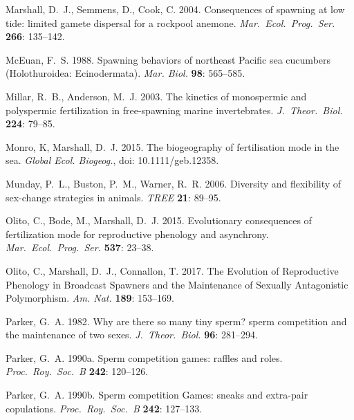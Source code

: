 \documentclass{article}
\begin{document}
\begin{thebibliography}{}
Marshall, D.~J., Semmens, D., Cook, C. 2004.
\newblock Consequences of spawning at low tide: limited gamete dispersal for a rockpool anemone.
\newblock \textit{Mar.~Ecol.~Prog.~Ser.} \textbf{266}: 135--142.

McEuan, F.~S. 1988.
\newblock Spawning behaviors of northeast Pacific sea cucumbers (Holothuroidea: Ecinodermata).
\newblock \textit{Mar. Biol.} \textbf{98}: 565--585.

Millar, R.~B., Anderson, M.~J. 2003.
\newblock The kinetics of monospermic and polyspermic fertilization in free-spawning marine invertebrates.
\newblock \textit{J.~Theor.~Biol.} \textbf{224}: 79--85.

Monro, K, Marshall, D.~J. 2015.
\newblock The biogeography of fertilisation mode in the sea.
\newblock \textit{Global Ecol. Biogeog.}, doi: 10.1111/geb.12358.

Munday, P.~L., Buston, P.~M., Warner, R.~R. 2006.
\newblock Diversity and flexibility of sex-change strategies in animals.
\newblock \textit{TREE} \textbf{21}: 89--95.

Olito, C., Bode, M., Marshall, D.~J. 2015.
\newblock Evolutionary consequences of fertilization mode for reproductive phenology and asynchrony.
\newblock \textit{Mar.~Ecol.~Prog.~Ser.} \textbf{537}: 23--38.

Olito, C., Marshall, D.~J., Connallon, T. 2017.
\newblock The Evolution of Reproductive Phenology in Broadcast Spawners and the Maintenance of Sexually Antagonistic Polymorphism.
\newblock \textit{Am. Nat.} \textbf{189}: 153--169.

Parker, G.~A. 1982.
\newblock Why are there so many tiny sperm? sperm competition and the maintenance of two sexes.
\newblock \textit{J.~Theor.~Biol.} \textbf{96}: 281--294.

Parker, G.~A. 1990a.
\newblock Sperm competition games: raffles and roles.
\newblock \textit{Proc.~Roy.~Soc.~B} \textbf{242}: 120--126.

Parker, G.~A. 1990b.
\newblock Sperm competition Games: sneaks and extra-pair copulations.
\newblock \textit{Proc.~Roy.~Soc.~B} \textbf{242}: 127--133.


\end{thebibliography}
\end{document}
